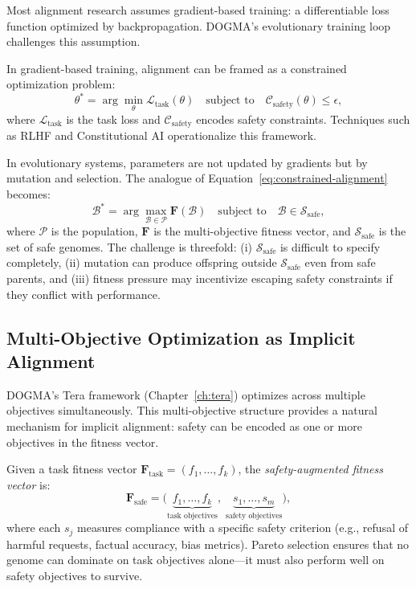 Most alignment research assumes gradient-based training: a differentiable loss function optimized by backpropagation.
DOGMA's evolutionary training loop challenges this assumption.

In gradient-based training, alignment can be framed as a constrained optimization problem:
\begin{equation}
\theta^* = \arg\min_\theta \mathcal{L}_{\text{task}}(\theta) \quad \text{subject to} \quad \mathcal{C}_{\text{safety}}(\theta) \leq \epsilon,
\label{eq:constrained-alignment}
\end{equation}
where $\mathcal{L}_{\text{task}}$ is the task loss and $\mathcal{C}_{\text{safety}}$ encodes safety constraints.
Techniques such as RLHF \citep{ouyang2022} and Constitutional AI \citep{bai2022} operationalize this framework.

In evolutionary systems, parameters are not updated by gradients but by mutation and selection.
The analogue of Equation~\ref{eq:constrained-alignment} becomes:
\begin{equation}
\mathcal{B}^* = \arg\max_{\mathcal{B} \in \mathcal{P}} \mathbf{F}(\mathcal{B}) \quad \text{subject to} \quad \mathcal{B} \in \mathcal{S}_{\text{safe}},
\label{eq:evolutionary-alignment}
\end{equation}
where $\mathcal{P}$ is the population, $\mathbf{F}$ is the multi-objective fitness vector, and $\mathcal{S}_{\text{safe}}$ is the set of safe genomes.
The challenge is threefold: (i) $\mathcal{S}_{\text{safe}}$ is difficult to specify completely, (ii) mutation can produce offspring outside $\mathcal{S}_{\text{safe}}$ even from safe parents, and (iii) fitness pressure may incentivize escaping safety constraints if they conflict with performance.

\subsection{Multi-Objective Optimization as Implicit Alignment}

DOGMA's Tera framework (Chapter~\ref{ch:tera}) optimizes across multiple objectives simultaneously.
This multi-objective structure provides a natural mechanism for implicit alignment: safety can be encoded as one or more objectives in the fitness vector.

\begin{dogmadef}
Given a task fitness vector $\mathbf{F}_{\text{task}} = (f_1, \ldots, f_k)$, the \emph{safety-augmented fitness vector} is:
\begin{equation}
\mathbf{F}_{\text{safe}} = \bigl(\underbrace{f_1, \ldots, f_k}_{\text{task objectives}},\; \underbrace{s_1, \ldots, s_m}_{\text{safety objectives}}\bigr),
\end{equation}
where each $s_j$ measures compliance with a specific safety criterion (e.g., refusal of harmful requests, factual accuracy, bias metrics).
Pareto selection ensures that no genome can dominate on task objectives alone---it must also perform well on safety objectives to survive.
\end{dogmadef}

